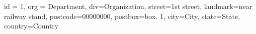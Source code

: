 \author 
  { 
    name = {Author 1},
    mail={author1@test.com,author01@test.com},
    phone={+91-0000-0000-000},
    url={author1.com},    
    affil={1},
    note={corresponding author}           
  } 
  
\author 
  { 
    name = {Author 单},
    mail={author2@test.com},
    phone={+91-0000-0000-000},
    url={author2.com},    
    affil={2},
    note={equally contributed}           
  }   

\affil 
  { 
    id = {1},
    org = {Department},
    div={Organization},
    street={1st street},
    landmark={near railway stand},    
	postcode={00000000},
	postbox={box. 1},	
    city={City},
    state={State},	
    country={Country}		
  }   
